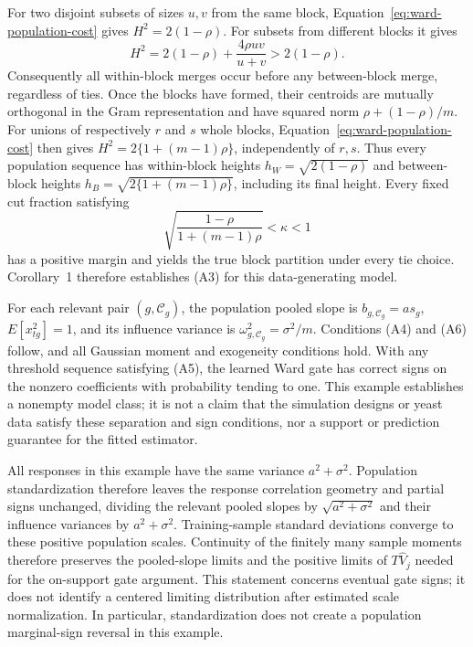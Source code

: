 \documentclass[11pt,a4paper]{article}
\begin{document}
For two disjoint subsets of sizes $u,v$ from the same block,
Equation~\eqref{eq:ward-population-cost} gives
$H^2=2(1-\rho)$. For subsets from different blocks it gives
\[
 H^2=2(1-\rho)+\frac{4\rho uv}{u+v}>2(1-\rho).
\]
Consequently all within-block merges occur before any between-block merge,
regardless of ties. Once the blocks have formed, their centroids are
mutually orthogonal in the Gram representation and have squared norm
$\rho+(1-\rho)/m$. For unions of respectively $r$ and $s$ whole blocks,
Equation~\eqref{eq:ward-population-cost} then gives
$H^2=2\{1+(m-1)\rho\}$, independently of $r,s$.
Thus every population sequence has within-block heights
$h_W=\sqrt{2(1-\rho)}$ and between-block heights
$h_B=\sqrt{2\{1+(m-1)\rho\}}$, including its final height. Every fixed cut
fraction satisfying
\begin{equation}\label{eq:ward-block-cut}
 \sqrt{\frac{1-\rho}{1+(m-1)\rho}}<\kappa<1
\end{equation}
has a positive margin and yields the true block partition under every tie
choice. Corollary~1 therefore establishes (A3) for this data-generating model.

For each relevant pair $(g,\mathcal C_g)$, the population pooled slope is
$b_{g,\mathcal C_g}=a s_g$, $E[x_{tg}^2]=1$, and its influence variance is
$\omega_{g,\mathcal C_g}^2=\sigma^2/m$. Conditions (A4) and (A6) follow,
and all Gaussian moment and exogeneity conditions hold. With any threshold
sequence satisfying (A5), the learned Ward gate has correct signs on the
nonzero coefficients with probability tending to one. This example establishes
a nonempty model class; it is not a claim that the simulation designs or yeast
data satisfy these separation and sign conditions, nor a support or prediction
guarantee for the fitted estimator.

All responses in this example have the same variance $a^2+\sigma^2$.
Population standardization therefore leaves the response correlation geometry
and partial signs unchanged, dividing the relevant pooled slopes by
$\sqrt{a^2+\sigma^2}$ and their influence variances by $a^2+\sigma^2$.
Training-sample standard deviations converge to these positive population
scales. Continuity of the finitely many sample moments therefore preserves
the pooled-slope limits and the positive limits of $T\widehat V_j$ needed
for the on-support gate argument. This statement concerns eventual gate
signs; it does not identify a centered limiting distribution after estimated
scale normalization. In particular, standardization does not create a
population marginal-sign reversal in this example.
\end{document}
